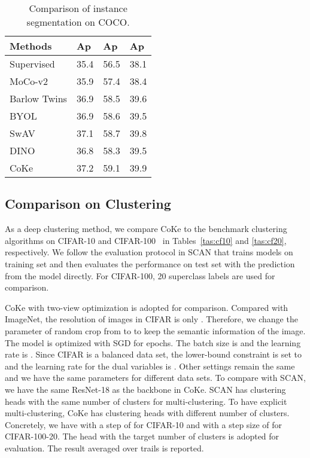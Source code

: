 \documentclass[10pt,twocolumn,letterpaper]{article}
\begin{document}
\begin{table}[!ht]
\centering
\begin{tabular}{|l|l|l|l|}\hline
Methods&Ap&Ap&Ap\\\hline
Supervised&35.4&56.5&38.1 \\\hline
MoCo-v2&35.9&57.4&38.4\\\hline
Barlow Twins&36.9&58.5&39.6 \\\hline
BYOL&36.9&58.6&39.5   \\\hline
SwAV&37.1&58.7&39.8 \\\hline
DINO&36.8&58.3&39.5\\\hline
CoKe&37.2&59.1&39.9\\\hline
\end{tabular}
\caption{Comparison of instance segmentation on COCO.}\label{tas:cocom}
\end{table}


\subsection{Comparison on Clustering}
As a deep clustering method, we compare CoKe to the benchmark clustering algorithms on CIFAR-10 and CIFAR-100~\cite{krizhevsky2009learning} in Tables~\ref{tas:cf10} and \ref{tas:cf20}, respectively. We follow the evaluation protocol in SCAN that trains models on training set and then evaluates the performance on test set with the prediction from the model directly. For CIFAR-100, 20 superclass labels are used for comparison. 

CoKe with two-view optimization is adopted for comparison. Compared with ImageNet, the resolution of images in CIFAR is only . Therefore, we change the parameter of random crop from  to  to keep the semantic information of the image. The model is optimized with SGD for  epochs. The batch size is  and the learning rate is . Since CIFAR is a balanced data set, the lower-bound constraint is set to  and the learning rate for the dual variables is . Other settings remain the same and we have the same parameters for different data sets. To compare with SCAN, we have the same ResNet-18 as the backbone in CoKe. SCAN has  clustering heads with the same number of clusters for multi-clustering. To have explicit multi-clustering, CoKe has  clustering heads with different number of clusters. Concretely, we have  with a step of  for CIFAR-10 and  with a step size of  for CIFAR-100-20. The head with the target number of clusters is adopted for evaluation. The result averaged over  trails is reported.
\end{document}
